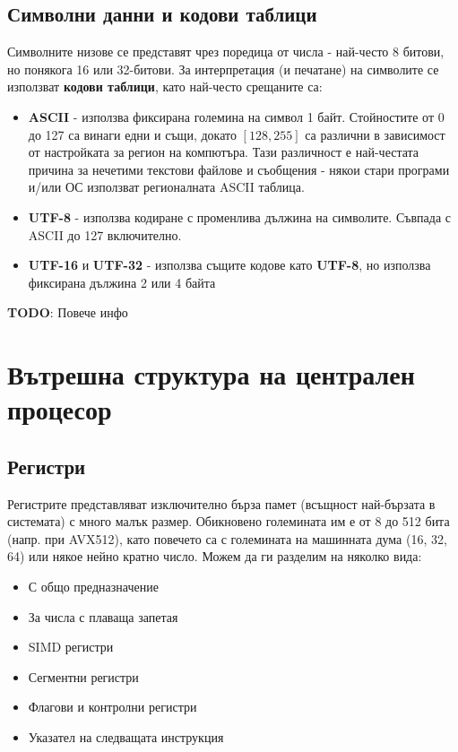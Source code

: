\documentclass[fleqn,12pt]{article}
\begin{document}
\subsection{Символни данни и кодови таблици}
Символните низове се представят чрез поредица от числа - най-често 8 битови, но понякога 16 или 32-битови. 
За интерпретация (и печатане) на символите се използват \textbf{кодови таблици}, като най-често срещаните са:
\begin{itemize}
    \item \textbf{ASCII} - използва фиксирана големина на символ 1 байт. Стойностите от 0 до 127 са винаги едни и същи, докато
    $[128,255]$ са различни в зависимост от настройката за регион на компютъра. Тази различност е най-честата причина за нечетими
    текстови файлове и съобщения - някои стари програми и/или ОС използват регионалната ASCII таблица.
    \item \textbf{UTF-8} - използва кодиране с променлива дължина на символите. Съвпада с ASCII до 127 включително.
    \item \textbf{UTF-16} и \textbf{UTF-32} - използва същите кодове като \textbf{UTF-8}, но използва фиксирана дължина 2 или 4 байта
\end{itemize}

\textbf{TODO}: Повече инфо

\section{Вътрешна структура на централен процесор}
\subsection{Регистри}
Регистрите представляват изключително бърза памет (всъщност най-бързата в системата) с много малък размер. Обикновено големината им е от 8 до 512 бита (напр. при AVX512),
като повечето са с големината на машинната дума (16, 32, 64) или някое нейно кратно число. Можем да ги разделим на няколко вида:
\begin{itemize}
    \item С общо предназначение
    \item За числа с плаваща запетая
    \item SIMD регистри
    \item Сегментни регистри
    \item Флагови и контролни регистри
    \item Указател на следващата инструкция
\end{itemize}
\end{document}
